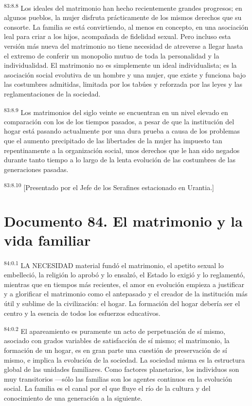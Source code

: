 \documentclass[twoside, 11pt]{book}
\begin{document}
\par
\textsuperscript{83:8.8} Los ideales del matrimonio han hecho recientemente grandes progresos; en algunos pueblos, la mujer disfruta prácticamente de los mismos derechos que su consorte. La familia se está convirtiendo, al menos en concepto, en una asociación leal para criar a los hijos, acompañada de fidelidad sexual. Pero incluso esta versión más nueva del matrimonio no tiene necesidad de atreverse a llegar hasta el extremo de conferir un monopolio mutuo de toda la personalidad y la individualidad. El matrimonio no es simplemente un ideal individualista; es la asociación social evolutiva de un hombre y una mujer, que existe y funciona bajo las costumbres admitidas, limitada por los tabúes y reforzada por las leyes y las reglamentaciones de la sociedad.

\par
\textsuperscript{83:8.9} Los matrimonios del siglo veinte se encuentran en un nivel elevado en comparación con los de los tiempos pasados, a pesar de que la institución del hogar está pasando actualmente por una dura prueba a causa de los problemas que el aumento precipitado de las libertades de la mujer ha impuesto tan repentinamente a la organización social, unos derechos que le han sido negados durante tanto tiempo a lo largo de la lenta evolución de las costumbres de las generaciones pasadas.

\par
\textsuperscript{83:8.10} [Presentado por el Jefe de los Serafines estacionado en Urantia.]


\chapter{Documento 84. El matrimonio y la vida familiar}
\par
\textsuperscript{84:0.1} LA NECESIDAD material fundó el matrimonio, el apetito sexual lo embelleció, la religión lo aprobó y lo ensalzó, el Estado lo exigió y lo reglamentó, mientras que en tiempos más recientes, el amor en evolución empieza a justificar y a glorificar el matrimonio como el antepasado y el creador de la institución más útil y sublime de la civilización: el hogar. La formación del hogar debería ser el centro y la esencia de todos los esfuerzos educativos.

\par
\textsuperscript{84:0.2} El apareamiento es puramente un acto de perpetuación de sí mismo, asociado con grados variables de satisfacción de sí mismo; el matrimonio, la formación de un hogar, es en gran parte una cuestión de preservación de sí mismo, e implica la evolución de la sociedad. La sociedad misma es la estructura global de las unidades familiares. Como factores planetarios, los individuos son muy transitorios ---sólo las familias son los agentes continuos en la evolución social. La familia es el canal por el que fluye el río de la cultura y del conocimiento de una generación a la siguiente.
\end{document}
